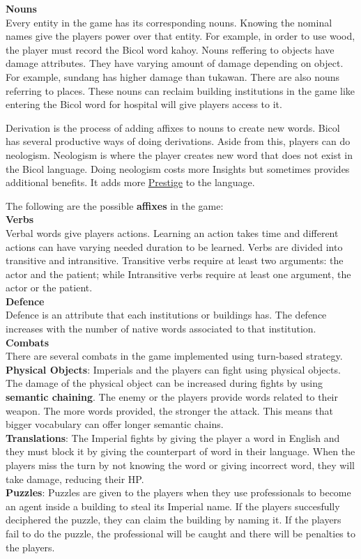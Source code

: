 \documentclass[11pt]{article}
\begin{document}
\textbf{Nouns}\\
Every entity in the game has its corresponding nouns. Knowing the nominal names give the players power over that entity. For example, in order to use wood, the player must record the Bicol word kahoy. Nouns reffering to objects have damage attributes. They have varying amount of damage depending on object. For example, sundang has higher damage than tukawan.
There are also nouns referring to places. These nouns can reclaim building institutions in the game like entering the Bicol word for hospital will give players access to it.

Derivation is the process of adding affixes to nouns to create new words. Bicol has several productive ways of doing derivations. Aside from this, players can do neologism. Neologism is where the player creates new word that does not exist in the Bicol language. Doing neologism costs more Insights but sometimes provides additional benefits. It adds more \hyperlink{prestige}{Prestige} to the language.

The following are the possible \textbf{affixes} in the game:\\


\textbf{Verbs}\\
Verbal words give players actions. Learning an action takes time and different actions can have varying needed duration to be learned. Verbs are divided into transitive and intransitive. Transitive verbs require at least two arguments: the actor and the patient; while Intransitive verbs require at least one argument, the actor or the patient.\\

\textbf{Defence}\\
Defence is an attribute that each institutions or buildings has. The defence increases with the number of native words associated to that institution.\\

\textbf{Combats}\\
There are several combats in the game implemented using turn-based strategy.\\
\textbf{Physical Objects}:
Imperials and the players can fight using physical objects. The damage of the physical object can be increased during fights by using \textbf{semantic chaining}. The enemy or the players provide words related to their weapon. The more words provided, the stronger the attack. This means that bigger vocabulary can offer longer semantic chains.\\
\textbf{Translations}:
The Imperial fights by giving the player a word in English and they must block it by giving the counterpart of word in their language. When the players miss the turn by not knowing the word or giving incorrect word, they will take damage, reducing their HP.\\
\textbf{Puzzles}:
Puzzles are given to the players when they use professionals to become an agent inside a building to steal its Imperial name. If the players succesfully deciphered the puzzle, they can claim the building by naming it. If the players fail to do the puzzle, the professional will be caught and there will be penalties to the players. \\
\end{document}
